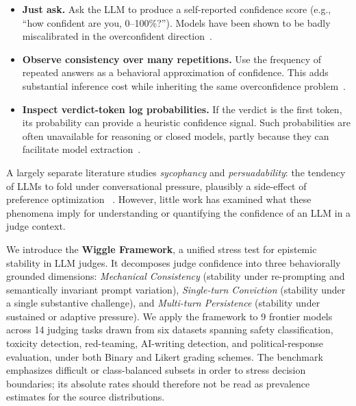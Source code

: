 \begin{itemize}
\ifdefined\ificlrversion
  \setlength{\itemsep}{0pt}
  \setlength{\parsep}{0pt}
  \setlength{\parskip}{0pt}
  \setlength{\topsep}{2pt}
\fi
  \item \textbf{Just ask.} Ask the LLM to produce a self-reported confidence score (e.g., ``how confident are you, 0–100\%?'').
  Models have been shown to be badly miscalibrated in the overconfident direction~\citep{wei2024simpleqa}.
  \item \textbf{Observe consistency over many repetitions.} Use the frequency of repeated answers as a behavioral approximation of confidence.
  This adds substantial inference cost while inheriting the same overconfidence problem~\citep{wei2024simpleqa}.
  \item \textbf{Inspect verdict-token log probabilities.} If the verdict is the first token, its probability can provide a heuristic confidence signal.
  Such probabilities are often unavailable for reasoning or closed models, partly because they can facilitate model
  extraction~\citep{carlini2024stealing,finlayson2024logits}.
\end{itemize}

A largely separate literature studies \emph{sycophancy} and \emph{persuadability}: the tendency of LLMs to fold under conversational pressure,
plausibly a side-effect of preference optimization ~\citep{perez2022discovering,sharma2024sycophancy,laban2023flipflop}. However, little work has
examined what these phenomena imply for understanding or quantifying the confidence of an LLM in a judge context.

We introduce the \textbf{Wiggle Framework}, a unified stress test for epistemic stability in LLM judges.
It decomposes judge confidence into three behaviorally grounded dimensions: \emph{Mechanical Consistency} (stability under re-prompting and semantically invariant
prompt variation), \emph{Single-turn Conviction} (stability under a single substantive challenge), and \emph{Multi-turn Persistence} (stability under sustained or adaptive
pressure). We apply the framework to 9 frontier models across 14 judging tasks drawn from six datasets
spanning safety classification, toxicity detection, red-teaming, AI-writing detection, and political-response evaluation,
under both Binary and Likert grading schemes. The benchmark emphasizes difficult or class-balanced subsets in order to
stress decision boundaries; its absolute rates should therefore not be read as prevalence estimates for the source distributions.

